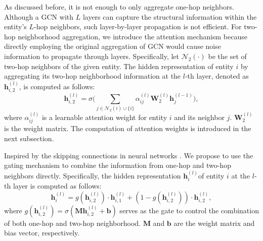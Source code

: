 \documentclass[letterpaper]{article} \usepackage{aaai20}  \usepackage{times}  \usepackage{helvet} \usepackage{courier}  \usepackage[hyphens]{url}  \usepackage{graphicx} \urlstyle{rm} \def\UrlFont{\rm}  \frenchspacing  \setlength{\pdfpagewidth}{8.5in}  \setlength{\pdfpageheight}{11in}  \usepackage{amsmath}
\begin{document}
As discussed before, it is not enough to only aggregate one-hop neighbors. Although a GCN with $L$ layers can capture the structural information within the entity’s $L$-hop neighbors, such layer-by-layer propagation is not efficient. For two-hop neighborhood aggregation, we introduce the attention mechanism because directly employing the original aggregation of GCN would cause noise information to propagate through layers. Specifically, let $\mathcal{N}_2(\cdot)$ be the set of two-hop neighbors of the given entity. The hidden representation of entity $i$ by aggregating its two-hop neighborhood information at the $l$-th layer, denoted as $\mathbf{h}_{i,2}^{(l)}$, is computed as follows:
\begin{equation} 
\label{eq:alinet2}
\mathbf{h}_{i,2}^{(l)} = \sigma \Big (\sum_{j\in \mathcal{N}_2(i)\cup \{i\}} \alpha^{(l)}_{ij} \mathbf{W}_2^{(l)} \mathbf{h}_j^{(l-1)} \Big ), 
\end{equation}
where $\alpha^{(l)}_{ij}$ is a learnable attention weight for entity $i$ and its neighbor $j$. $\mathbf{W}_2^{(l)}$ is the weight matrix. The computation of attention weights is introduced in the next subsection.

Inspired by the skipping connections in neural networks \cite{HighwayNet,ResNet,RSN}. We propose to use the gating mechanism to combine the information from one-hop and two-hop neighbors directly. Specifically, the hidden representation $\mathbf{h}_{i}^{(l)}$of entity $i$ at the $l$-th layer is computed as follows:
\begin{equation} 
\label{eq:gating}
\mathbf{h}_{i}^{(l)} = g(\mathbf{h}_{i,2}^{(l)}) \cdot \mathbf{h}_{i,1}^{(l)} + (1-g(\mathbf{h}_{i,2}^{(l)})) \cdot \mathbf{h}_{i,2}^{(l)},
\end{equation}
where $g(\mathbf{h}_{i,2}^{(l)}) = \sigma(\mathbf{M} \mathbf{h}_{i,2}^{(l)} + \mathbf{b})$ serves as the gate to control the combination of both one-hop and two-hop neighborhood. $\mathbf{M}$ and $\mathbf{b}$ are the weight matrix and bias vector, respectively. 
\end{document}
